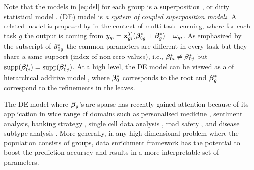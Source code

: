 Note that the models in \eqref{eq:dsl} for each group is a superposition \cite{guba16, mctr13}, or dirty statistical model \cite{yara13}. %
(DE) model is \emph{a system of coupled superposition models}.
A related model is proposed by \cite{jrsr10} in the context of multi-task learning, where for each task $g$ the output is coming from $y_{gi} = \mathbf{x}_{gi}^T (\boldsymbol{\beta}_{0g}^* + \boldsymbol{\beta}^*_g) + \omega_{gi}$.
As emphasized by the subscript of $\boldsymbol{\beta}_{0g}^*$ the common parameters are different in every task but they share a same support (index of non-zero values), i.e., $\boldsymbol{\beta}_{0i}^* \neq \boldsymbol{\beta}_{0j}^*$ but $\text{supp}(\boldsymbol{\beta}_{0i}^*) = \text{supp}(\boldsymbol{\beta}_{0j}^*)$. {}  
At a high level, the DE model can be viewed as a
of hierarchical additive model \cite{hastie2017generalized,rigby2005generalized} {\color{red}{couldn't find good ref, we might want to remove this}}, where $\boldsymbol{\beta}_0^*$ corresponds to the root and $\boldsymbol{\beta}_g^*$ correspond to the refinements in the leaves. 


The DE model where $\boldsymbol{\beta}_g$'s are sparse has recently gained attention because of its application in wide range of domains such as personalized medicine \cite{domu16}, sentiment analysis, banking strategy \cite{grti16}, single cell data analysis \cite{olvi15}, road safety \cite{olvi14}, and disease subtype analysis \cite{domu16}.
More generally, in any high-dimensional problem where the population consists of groups, data enrichment framework has the potential to boost the prediction accuracy and results in a more interpretable set of parameters.

